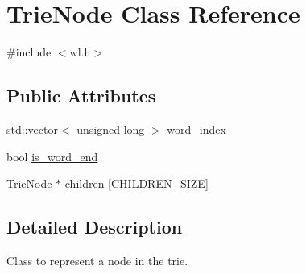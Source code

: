 \hypertarget{classTrieNode}{\section{Trie\-Node Class Reference}
\label{classTrieNode}
}


{\ttfamily \#include $<$wl.\-h$>$}

\subsection*{Public Attributes}
\begin{DoxyCompactItemize}
\item 
std\-::vector$<$ unsigned long $>$ \hyperlink{classTrieNode_a2f0a51cb24bc20bdc6f368c1fef53e67}{word\-\_\-index}
\item 
bool \hyperlink{classTrieNode_a14983627e54ef24a0963d2836755dcaf}{is\-\_\-word\-\_\-end}
\item 
\hyperlink{classTrieNode}{Trie\-Node} $\ast$ \hyperlink{classTrieNode_a69ae75c32241f3f6b49f3aad6e6fb6f2}{children} \mbox{[}C\-H\-I\-L\-D\-R\-E\-N\-\_\-\-S\-I\-Z\-E\mbox{]}
\end{DoxyCompactItemize}


\subsection{Detailed Description}
Class to represent a node in the trie. 

